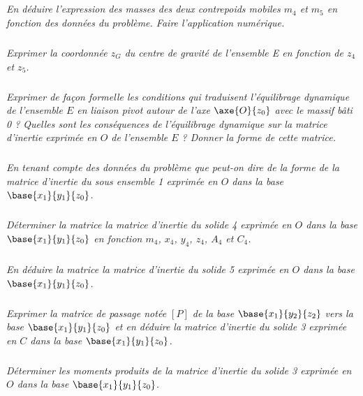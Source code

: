 \begin{multicols}{2}
\subparagraph{}
\textit{En déduire l’expression des masses des deux contrepoids mobiles $m_4$ et $m_5$ en fonction des données du
problème. Faire l’application numérique. }
\ifprof
\begin{corrige}
\end{corrige}\else\fi


\subparagraph{}
\textit{Exprimer la coordonnée $z_G$ du centre de gravité de l’ensemble E en fonction de $z_4$ et $z_5$.}
\ifprof
\begin{corrige}
\end{corrige}\else\fi


\subparagraph{}
\textit{Exprimer de façon formelle les conditions qui traduisent l’équilibrage dynamique de l’ensemble $E$ en liaison pivot autour de l’axe $\axe{O}{z_0}$ avec le massif bâti 0 ? Quelles sont les conséquences de l’équilibrage dynamique sur la matrice d’inertie exprimée en $O$ de l’ensemble $E$ ? Donner la forme de cette matrice.}
\ifprof
\begin{corrige}
\end{corrige}\else\fi


\subparagraph{}
\textit{ En tenant compte des données du problème que peut-on dire de la forme de la matrice d’inertie du
sous ensemble 1 exprimée en $O$ dans la base $\base{x_1}{y_1}{z_0}$.}
\ifprof
\begin{corrige}
\end{corrige}\else\fi


\subparagraph{}
\textit{Déterminer la matrice la matrice d’inertie du solide 4 exprimée en $O$ dans la base $\base{x_1}{y_1}{z_0}$ en fonction $m_4$, $x_4$, $y_4$, $z_4$, $A_4$ et $C_4$.}
\ifprof
\begin{corrige}
\end{corrige}\else\fi


\subparagraph{}
\textit{En déduire la matrice la matrice d’inertie du solide 5 exprimée en $O$ dans la base $\base{x_1}{y_1}{z_0}$.
}
\ifprof
\begin{corrige}
\end{corrige}\else\fi


\subparagraph{}
\textit{Exprimer la matrice de passage notée $[P]$ de la base $\base{x_1}{y_2}{z_2}$ vers la base $\base{x_1}{y_1}{z_0}$ et en déduire la matrice d’inertie du solide 3 exprimée en $C$ dans la base $\base{x_1}{y_1}{z_0}$.}
\ifprof
\begin{corrige}
\end{corrige}\else\fi

\subparagraph{}
\textit{Déterminer les moments produits de la matrice d’inertie du solide 3 exprimée en $O$ dans la base $\base{x_1}{y_1}{z_0}$.}
\ifprof
\begin{corrige}
\end{corrige}\else\fi


\end{multicols}
